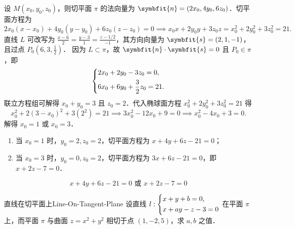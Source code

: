 \begin{solution}
    设 $M(x_0, y_0, z_0)$，则切平面 $\pi$ 的法向量为 $\symbfit{n} = (2x_0, 4y_0, 6z_0)$．切平面方程为
    \begin{equation}
        2x_0(x - x_0) + 4y_0(y - y_0) + 6z_0(z - z_0) = 0 \implies x_0x + 2y_0y + 3z_0z = x_0^2 + 2y_0^2 + 3z_0^2 = 21.
    \end{equation}
    直线 $L$ 可改写为 $\frac{x - 6}{2} = \frac{y - 3}{1} = \frac{z - 1/2}{-1}$，其方向向量为 $\symbfit{s} = (2, 1, -1)$，且过点 $P_0(6, 3, \frac{1}{2})$．
    因为 $L \subset \pi$，故 $\symbfit{n} \cdot \symbfit{s} = 0$ 且 $P_0 \in \pi$，即
    \begin{equation}
        \begin{dcases}
            2x_0 + 2y_0 - 3z_0 = 0, \\
            6x_0 + 6y_0 + \frac{3}{2}z_0 = 21.
        \end{dcases}
    \end{equation}
    联立方程组可解得 $x_0 + y_0 = 3$ 且 $z_0 = 2$．代入椭球面方程 $x_0^2 + 2y_0^2 + 3z_0^2 = 21$ 得
    \begin{equation}
        x_0^2 + 2(3 - x_0)^2 + 3(2^2) = 21 \implies 3x_0^2 - 12x_0 + 9 = 0 \implies x_0^2 - 4x_0 + 3 = 0.
    \end{equation}
    解得 $x_0 = 1$ 或 $x_0 = 3$．
    \begin{enumerate}
        \item 当 $x_0 = 1$ 时，$y_0 = 2, z_0 = 2$，切平面方程为 $x + 4y + 6z - 21 = 0$；
        \item 当 $x_0 = 3$ 时，$y_0 = 0, z_0 = 2$，切平面方程为 $3x + 6z - 21 = 0$，即 $x + 2z - 7 = 0$．
    \end{enumerate}
    \begin{equation}
        \boxed{x + 4y + 6z - 21 = 0 \text{ 或 } x + 2z - 7 = 0}
    \end{equation}
\end{solution}


\begin{problem}{直线在切平面上}{Line-On-Tangent-Plane}
    设直线 $l: \begin{dcases} x + y + b = 0, \\ x + ay - z - 3 = 0 \end{dcases}$ 在平面 $\pi$ 上，而平面 $\pi$ 与曲面 $z = x^2 + y^2$ 相切于点 $(1, -2, 5)$，求 $a, b$ 之值．
\end{problem}

